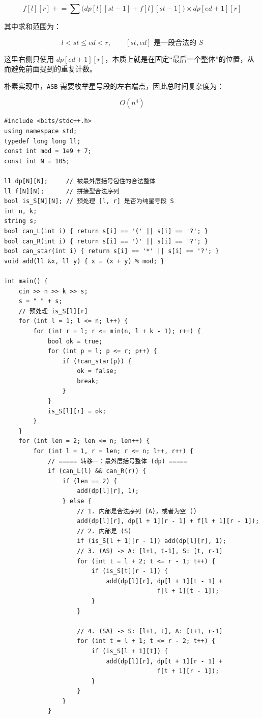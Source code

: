 \documentclass{book}
\newcommand{\code}[1]{\colorbox{codebg}{\texttt{#1}}}  %
\begin{document}
$$
f[l][r]\mathrel{+}=
\sum
\bigl(dp[l][st-1]+f[l][st-1]\bigr)\times dp[ed+1][r]
$$

其中求和范围为：

$$
l<st\le ed<r,\qquad [st,ed]\text{ 是一段合法的 }S
$$

这里右侧只使用 $dp[ed+1][r]$，本质上就是在固定“最后一个整体”的位置，从而避免前面提到的重复计数。

朴素实现中，\code{ASB} 需要枚举星号段的左右端点，因此总时间复杂度为：

$$
O(n^4)
$$

\newpage
\begin{lstlisting}[style = code]
#include <bits/stdc++.h>
using namespace std;
typedef long long ll;
const int mod = 1e9 + 7;
const int N = 105;

ll dp[N][N];     // 被最外层括号包住的合法整体
ll f[N][N];      // 拼接型合法序列
bool is_S[N][N]; // 预处理 [l, r] 是否为纯星号段 S
int n, k; 
string s;
bool can_L(int i) { return s[i] == '(' || s[i] == '?'; }
bool can_R(int i) { return s[i] == ')' || s[i] == '?'; }
bool can_star(int i) { return s[i] == '*' || s[i] == '?'; }
void add(ll &x, ll y) { x = (x + y) % mod; }

int main() {
    cin >> n >> k >> s;
    s = " " + s;
    // 预处理 is_S[l][r]
    for (int l = 1; l <= n; l++) {
        for (int r = l; r <= min(n, l + k - 1); r++) {
            bool ok = true;
            for (int p = l; p <= r; p++) {
                if (!can_star(p)) { 
                    ok = false; 
                    break; 
                }
            }
            is_S[l][r] = ok;
        }
    }
    for (int len = 2; len <= n; len++) {
        for (int l = 1, r = len; r <= n; l++, r++) {
            // ===== 转移一：最外层括号整体 (dp) =====
            if (can_L(l) && can_R(r)) {
                if (len == 2) {
                    add(dp[l][r], 1); 
                } else {
                    // 1. 内部是合法序列 (A)，或者为空 ()
                    add(dp[l][r], dp[l + 1][r - 1] + f[l + 1][r - 1]);
                    // 2. 内部是 (S)
                    if (is_S[l + 1][r - 1]) add(dp[l][r], 1);
                    // 3. (AS) -> A: [l+1, t-1], S: [t, r-1]
                    for (int t = l + 2; t <= r - 1; t++) {
                        if (is_S[t][r - 1]) {
                            add(dp[l][r], dp[l + 1][t - 1] + 
                                          f[l + 1][t - 1]);
                        }
                    }
                    
                    // 4. (SA) -> S: [l+1, t], A: [t+1, r-1]
                    for (int t = l + 1; t <= r - 2; t++) {
                        if (is_S[l + 1][t]) {
                            add(dp[l][r], dp[t + 1][r - 1] + 
                                          f[t + 1][r - 1]);
                        }
                    }
                }
            }


\end{lstlisting}
\end{document}
